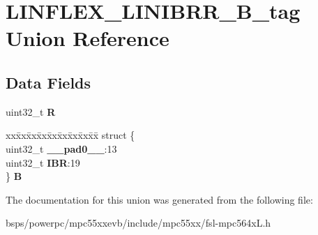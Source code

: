 \hypertarget{unionLINFLEX__LINIBRR__32B__tag}{}\section{L\+I\+N\+F\+L\+E\+X\+\_\+\+L\+I\+N\+I\+B\+R\+R\+\_\+B\+\_\+tag Union Reference}
\label{unionLINFLEX__LINIBRR__32B__tag}
\subsection*{Data Fields}
\begin{DoxyCompactItemize}
\item 
\mbox{\label{unionLINFLEX__LINIBRR__32B__tag_abdfe4cba15e7616ebdb2d712ef558330}} 
uint32\+\_\+t {\bfseries R}
\item 
\mbox{\label{unionLINFLEX__LINIBRR__32B__tag_a00a1d1c080c8083e0d69f94e346e1a5b}} 
\begin{tabbing}
xx\=xx\=xx\=xx\=xx\=xx\=xx\=xx\=xx\=\kill
struct \{\\
\>uint32\_t {\bfseries \_\_pad0\_\_}:13\\
\>uint32\_t {\bfseries IBR}:19\\
\} {\bfseries B}\\

\end{tabbing}\end{DoxyCompactItemize}


The documentation for this union was generated from the following file\+:\begin{DoxyCompactItemize}
\item 
bsps/powerpc/mpc55xxevb/include/mpc55xx/fsl-\/mpc564x\+L.\+h\end{DoxyCompactItemize}
